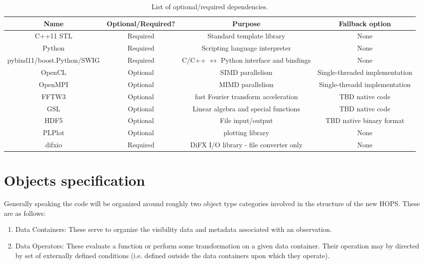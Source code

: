 \documentclass[hidelinks]{article}
\let\Oldsection\section
\renewcommand{\section}{\FloatBarrier\Oldsection}
\begin{document}
\begin{center}
\begin{table}[h!]
\begin{adjustbox}{width=\textwidth}
\begin{tabular}{|c|c|c|c|}
\hline
Name & Optional/Required? & Purpose & Fallback option \\ \hline
C++11 STL & Required & Standard template library & None \\ \hline
Python &  Required & Scripting language interpreter & None \\ \hline
pybind11/boost.Python/SWIG & Required & C/C++ $\leftrightarrow$ Python interface and bindings & None \\ \hline
OpenCL & Optional & SIMD parallelism & Single-threaded implementation \\ \hline
OpenMPI & Optional & MIMD parallelism & Single-threadd implementation \\ \hline
FFTW3 & Optional & fast Fourier transform acceleration & TBD native code \\ \hline
GSL & Optional & Linear algebra and special functions & TBD native code \\ \hline
HDF5 & Optional & File input/output & TBD native binary format \\ \hline
PLPlot & Optional & plotting library & None \\ \hline
difxio & Required & DiFX I/O library - file converter only & None \\ \hline
\end{tabular}
\end{adjustbox}
\caption{List of optional/required dependencies.}
\label{tab:dep}
\end{table}
\end{center}


\section{Objects specification}

\label{sec:objects}


Generally speaking the code will be organized around roughly two object type categories involved in the structure of the new HOPS. These are as follows:

\begin{enumerate}
 \item Data Containers: These serve to organize the visibility data and metadata associated with an observation.
 \item Data Operators: These evaluate a function or perform some transformation on a given data container. Their operation may by directed by set of externally defined conditions (i.e. defined outside the data containers upon which they operate).
\end{enumerate}
\end{document}
